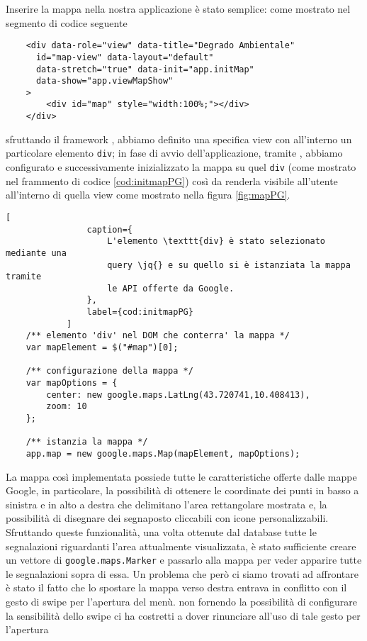 			Inserire la mappa nella nostra applicazione \pg{} è stato semplice:
			come mostrato nel segmento di codice seguente
			\begin{lstlisting}
	<div data-role="view" data-title="Degrado Ambientale"
	  id="map-view" data-layout="default"
	  data-stretch="true" data-init="app.initMap"
	  data-show="app.viewMapShow"
	>
		<div id="map" style="width:100%;"></div>
	</div>
			\end{lstlisting}
			sfruttando il framework \kendomob{}, abbiamo definito una specifica
			view con all'interno un particolare elemento \texttt{div}; in fase di
			avvio dell'applicazione, tramite \js{}, abbiamo configurato e
			successivamente inizializzato la mappa su quel \texttt{div} (come
			mostrato nel frammento di codice \ref{cod:initmapPG}) così
			da renderla visibile all'utente all'interno di quella view come
			mostrato nella figura \ref{fig:mapPG}.
			\begin{lstlisting}[
				caption={
				    L'elemento \texttt{div} è stato selezionato mediante una
				    query \jq{} e su quello si è istanziata la mappa tramite
				    le API offerte da Google.
				},
				label={cod:initmapPG}
			]
	/** elemento 'div' nel DOM che conterra' la mappa */
	var mapElement = $("#map")[0];

	/** configurazione della mappa */
	var mapOptions = {
		center: new google.maps.LatLng(43.720741,10.408413),
		zoom: 10
	};

	/** istanzia la mappa */
	app.map = new google.maps.Map(mapElement, mapOptions);
			\end{lstlisting}
			La mappa così implementata possiede tutte le caratteristiche offerte
			dalle mappe Google, in particolare, la possibilità di ottenere le
			coordinate dei punti in basso a sinistra e in alto a destra che
			delimitano l'area rettangolare mostrata e, la possibilità di
			disegnare dei segnaposto cliccabili con icone personalizzabili.
			Sfruttando queste funzionalità, una volta ottenute dal database
			tutte le segnalazioni riguardanti l'area attualmente visualizzata, è
			stato sufficiente creare un vettore di \texttt{google.maps.Marker} e
			passarlo alla mappa per	veder apparire tutte le segnalazioni sopra
			di essa. Un problema che però ci siamo trovati ad affrontare è stato
			il fatto che lo spostare la mappa verso destra entrava in conflitto
			con il gesto di swipe per l'apertura del menù. \kendomob{} non
			fornendo la possibilità di configurare la sensibilità dello swipe ci
			ha costretti a dover rinunciare all'uso di tale gesto per l'apertura
